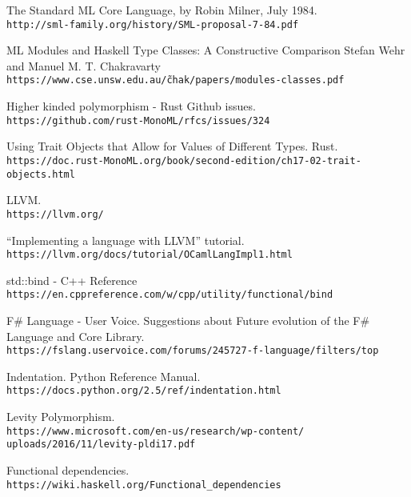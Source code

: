 \documentclass[declaration,shortabstract]{iithesis}
\begin{document}
\begin{thebibliography}{1}

The Standard ML Core Language, by Robin Milner, July 1984.
\\\texttt{http://sml-family.org/history/SML-proposal-7-84.pdf}

ML Modules and Haskell Type Classes:
A Constructive Comparison
Stefan Wehr and Manuel M. T. Chakravarty
\\\texttt{https://www.cse.unsw.edu.au/\~chak/papers/modules-classes.pdf}

Higher kinded polymorphism - Rust Github issues.
\\\texttt{https://github.com/rust-MonoML/rfcs/issues/324}

Using Trait Objects that Allow for Values of Different Types. Rust.
\\\texttt{https://doc.rust-MonoML.org/book/second-edition/ch17-02-trait-objects.html}

LLVM.
\\\texttt{https://llvm.org/}

“Implementing a language with LLVM” tutorial.
\\\texttt{https://llvm.org/docs/tutorial/OCamlLangImpl1.html}

std::bind - C++ Reference
\\\texttt{https://en.cppreference.com/w/cpp/utility/functional/bind}

F\# Language - User Voice.  Suggestions about Future evolution of the 
F\# Language and Core Library.
\\\texttt{https://fslang.uservoice.com/forums/245727-f-language/filters/top}

Indentation. Python Reference Manual.
\\\texttt{https://docs.python.org/2.5/ref/indentation.html}

Levity Polymorphism.
\\\texttt{https://www.microsoft.com/en-us/research/wp-content/\newline
uploads/2016/11/levity-pldi17.pdf}

Functional dependencies.
\\\texttt{https://wiki.haskell.org/Functional\_dependencies}


\end{thebibliography}
\end{document}
